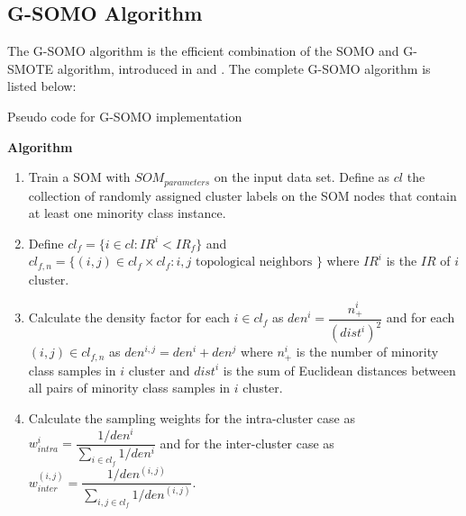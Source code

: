 \documentclass[parskip=full]{scrartcl}
\begin{document}
\subsection{G-SOMO Algorithm}

The G-SOMO algorithm is the efficient combination of the SOMO and G-SMOTE
algorithm, introduced in \cite{Douzas2017} and \cite{Douzas2019}. The complete
G-SOMO algorithm is listed below:

\begin{algorithm}[H]

	\SetAlgoLined
	\caption{Pseudo code for G-SOMO implementation}
	
	\BlankLine
	
	

	\BlankLine

	\textbf{Algorithm}
	\SetAlgoLined

	\begin{enumerate}

		\item Train a SOM with $SOM_{parameters}$ on the input data set. Define
			  as $cl$ the collection of randomly assigned cluster labels on the
			  SOM nodes that contain at least one minority class instance.
	
		\item Define $cl_{f} =\{i \in cl: IR^{i} < IR_{f} \} $ and 	
			  $cl_{f, n} =\{(i, j) \in cl_{f} \times cl_{f}: i, j \text{ topological neighbors } \} $ 
			  where $IR^{i}$ is the $IR$ of  $i$ cluster.
	
		\item Calculate the density factor for each $i \in cl_{f}$  as $den^{i}
			  = \dfrac{n^{i}_{+}}{(dist^{i})^2}$ and for each $(i, j) \in cl_{f, n}$ 
			  as $den^{i, j} = den^{i} + den^{j}$ where $n^{i}_{+}$ is the
			  number of minority class samples in $i$ cluster and $dist^{i}$ is
			  the sum of Euclidean distances between all pairs  of minority
			  class samples in $i$ cluster.
	
		\item Calculate the sampling weights for the intra-cluster case as
			  $w^{i}_{intra} = \dfrac{1 / den^{i}}{\sum_{i \in cl_{f}} 1/den^{i}}$ and
			  for the inter-cluster case as 
			  $w^{(i, j)}_{inter} = \dfrac{1 / den^{(i, j)}}{\sum_{i,j \in cl_{f}} 1/den^{(i,j)}}$.
	

\end{enumerate}
\end{algorithm}
\end{document}
